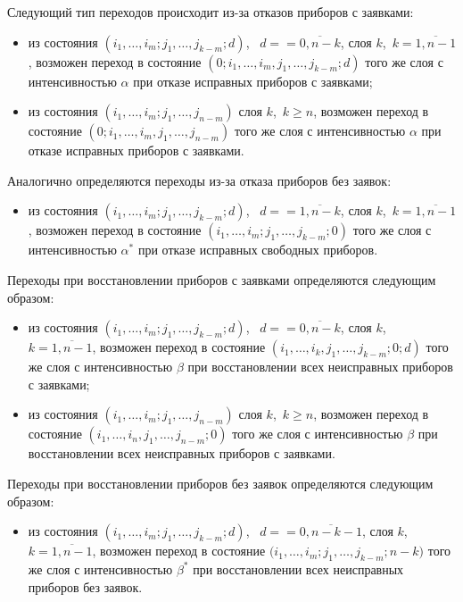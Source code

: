 \begin{multicols}{2}
Следующий тип переходов происходит из-за отказов приборов с
заявками:
\begin{itemize}
\item
из состояния
$(i_1,\ldots,i_{m};j_1,\ldots,j_{k-m};d)$, \  $d=$\linebreak $=\overline{0,n-k}$,
слоя $k$,\  $k=\overline{1,n-1}$, возможен переход в состояние
$(0;i_1,\ldots,i_{m},j_1,\ldots,j_{k-m};d)$
того же слоя с интенсивностью $\alpha$ при отказе исправных
приборов с заявками;
\item
 из состояния
$(i_1,\ldots,i_{m};j_1,\ldots,j_{n-m})$
слоя $k$,\ $k\ge n$, возможен переход в состояние
$(0;i_1,\ldots,i_{m},j_1,\ldots,j_{n-m})$ того же слоя с
интенсивностью $\alpha$ при отказе исправных приборов с заявками.
\end{itemize}

Аналогично определяются переходы из-за отказа приборов без заявок:
\begin{itemize}
\item
из состояния
$(i_1,\ldots,i_{m};j_1,\ldots,j_{k-m};d)$, \ $d=$\linebreak $=\overline{1,n-k}$,
слоя $k$,\ $k=\overline{1,n-1}$, возможен переход в состояние
$(i_1,\ldots,i_{m};j_1,\ldots,j_{k-m};0)$
того же слоя с интенсивностью $\alpha^*$ при отказе исправных
свободных приборов.
\end{itemize}

Переходы при восстановлении приборов с заявками определяются
следующим образом:
\begin{itemize}
\item
из состояния
$(i_1,\ldots,i_{m};j_1,\ldots,j_{k-m};d)$, \  $d=$\linebreak $=\overline{0,n-k}$,
слоя $k$, \ $k=\overline{1,n-1}$, возможен переход в состояние
$(i_1,\ldots,i_{k},j_1,\ldots,j_{k-m};0;d)$ того же слоя с
интенсивностью $\beta$ при вос\-ста\-нов\-ле\-нии всех неисправных
приборов с за\-яв\-ками;
\item
из состояния
$(i_1,\ldots,i_{m};j_1,\ldots,j_{n-m})$
слоя $k$,\ $k\ge n$, возможен переход в состояние
$(i_1,\ldots,i_{n},j_1,\ldots,j_{n-m};0)$
того же слоя с интенсивностью $\beta$ при восстановлении всех
неисправных приборов с заявками.
\end{itemize}

Переходы при восстановлении приборов без заявок определяются
следующим образом:
\begin{itemize}
\item
из состояния
$(i_1,\ldots,i_{m};j_1,\ldots,j_{k-m};d)$, \  $d=$\linebreak $=\overline{0,n-k-1}$,
слоя $k$,\ $k=\overline{1,n-1}$, возможен переход в состояние
$(i_1,\ldots,i_{m};j_1,\ldots,j_{k-m};$\linebreak $n-k)$
того же слоя с интенсивностью $\beta^*$ при восстановлении всех
неисправных приборов без заявок.
\end{itemize}


\end{multicols}
